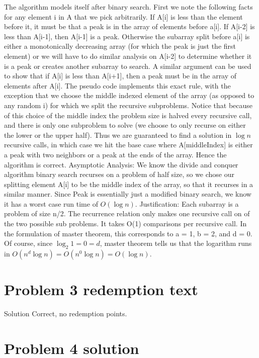 \documentclass[11pt]{article}
\begin{document}
The algorithm models itself after binary search. First we note the following facts for any element i in A that we pick arbitrarily. If A[i] is less than the element before it, it must be that a peak is in the array of elements before a[i]. If A[i-2] is less than A[i-1], then A[i-1] is a peak. Otherwise the subarray split before a[i] is either a monotonically decreasing array (for which the peak is just the first element) or we will have to do similar analysis on A[i-2] to determine whether it is a peak or creates another subarray to search. A similar argument can be used to show that if A[i] is less than A[i+1], then a peak must be in the array of elements after A[i]. The pseudo code implements this exact rule, with the exception that we choose the middle indexed element of the array (as opposed to any random i) for which we split the recursive subproblems. Notice that because of this choice of the middle index the problem size is halved every recursive call, and there is only one subproblem to solve (we choose to only recurse on either the lower or the upper half). Thus we are guaranteed to find a solution in $\log n$ recursive calls, in which case we hit the base case where A[middleIndex] is either a peak with two neighbors or a peak at the ends of the array. Hence the algorithm is correct.
\newline
Asymptotic Analysis:\newline
We know the divide and conquer algorithm binary search recurses on a problem of half size, so we chose our splitting element A[i] to be the middle index of the array, so that it recurses in a similar manner. Since Peak is essentially just a modified binary search, we know it has a worst case run time of $O(\log n)$.\newline
Justification:\newline
Each subarray is a problem of size n/2. The recurrence relation only makes one recursive call on of the two possible sub problems. It takes O(1) comparisons per recursive call. In the formulation of master theorem, this corresponds to a = 1, b = 2, and d = 0. Of course, since $\log_2 1 = 0 = d$, master theorem tells us that the logarithm runs in $O(n^d \log n) = O(n^0 \log n) = O(\log n)$.

\newpage
\section*{Problem 3 redemption text}
Solution Correct, no redemption points.

\newpage
\section*{Problem 4 solution}
\end{document}
